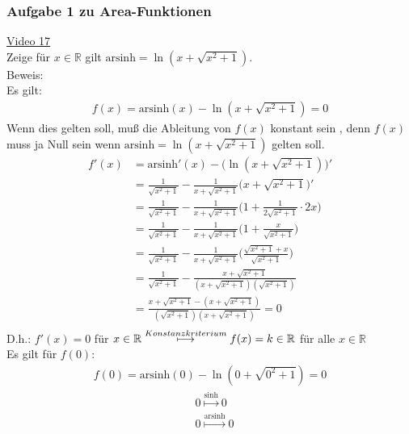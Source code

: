 \subsubsection{Aufgabe 1 zu Area-Funktionen}
\href{https://youtu.be/fkV0enqPc9E}{Video 17}\\
Zeige für $ x\in \mathbb{R} $ gilt $\mathrm{arsinh}=\ln(x+\sqrt{x^2+1})$.\\
Beweis:\\
Es gilt:\\
\begin{align*}
f(x)=\mathrm{arsinh}(x)-\ln(x+\sqrt{x^2+1})=0
\end{align*}
Wenn dies gelten soll, muß die Ableitung von $ f(x) $ konstant sein , denn $ f(x) $ muss ja Null sein wenn $\mathrm{arsinh}=\ln(x+\sqrt{x^2+1})  $ gelten soll.\\
\begin{align*}
f'(x)&=\mathrm{arsinh}'(x)-\big (\ln(x+\sqrt{x^2+1})\big )'\\
&=\frac{1}{\sqrt{x^2+1}}-\frac{1}{x+\sqrt{x^2+1}}\big(x+\sqrt{x^2+1}\big)'\\
&=\frac{1}{\sqrt{x^2+1}}-\frac{1}{x+\sqrt{x^2+1}}\bigg(1+\frac{1}{2\sqrt{x^2+1}}\cdot 2x\bigg)\\
&=\frac{1}{\sqrt{x^2+1}}-\frac{1}{x+\sqrt{x^2+1}}\bigg(1+\frac{x}{\sqrt{x^2+1}}\bigg)\\
&=\frac{1}{\sqrt{x^2+1}}-\frac{1}{x+\sqrt{x^2+1}}\bigg(\frac{\sqrt{x^2+1}+x}{\sqrt{x^2+1}}\bigg)\\
&=\frac{1}{\sqrt{x^2+1}}-\frac{x+\sqrt{x^2+1}}{(x+\sqrt{x^2+1})(\sqrt{x^2+1})}\\
&=\frac{x+\sqrt{x^2+1}-(x+\sqrt{x^2+1})}{(\sqrt{x^2+1})(x+\sqrt{x^2+1})}=0\\
\end{align*}
D.h.: $ f'(x)=0 $ für $ x\in \mathbb{R} \overset{\tiny Konstanzkriterium}{\longmapsto} f(x)=k\in\mathbb{R} $ für alle $ x\in \mathbb{R} $\\
Es gilt für $ f(0) $:\\
\begin{align*}
f(0)=\mathrm{arsinh}(0)-\ln(0+\sqrt{0^2+1})=0
\end{align*}
\begin{align*}
&0\overset{\mathrm{sinh}}{\longmapsto} 0\\
&0\overset{\mathrm{arsinh}}{\longmapsto} 0\\
\end{align*}
